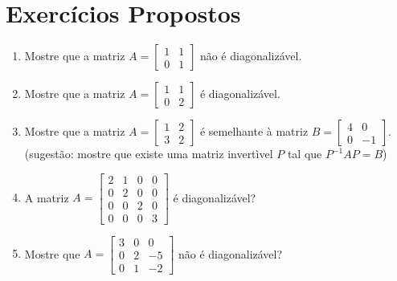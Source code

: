 \section{Exercícios Propostos}
\begin{enumerate}
\item  Mostre que a matriz
$A= \begin{bmatrix}
1 & 1\\
 0& 1
\end{bmatrix}$  não é diagonalizável.

\item  Mostre que a matriz
$A= \begin{bmatrix}
1 & 1\\
 0& 2
\end{bmatrix}$ é diagonalizável.

\item Mostre que a matriz
$A= \begin{bmatrix}
1 & 2\\
 3& 2
\end{bmatrix}$  é semelhante à matriz
$B= \begin{bmatrix}
4 & 0\\
 0& -1
\end{bmatrix}$. (sugestão: mostre que existe uma matriz invertìvel $P$ tal que $P^{-1}AP=B$)

\item A matriz
$A=
\begin{bmatrix}
2 &1&0&0\\
0&2&0&0\\
0&0&2&0\\
0&0&0&3
\end{bmatrix}$ é diagonalizável?

\item Mostre que
$A=
\begin{bmatrix}
3 &0&0\\
0&2&-5\\
0&1&-2
\end{bmatrix}$ não é diagonalizável?



\end{enumerate}


